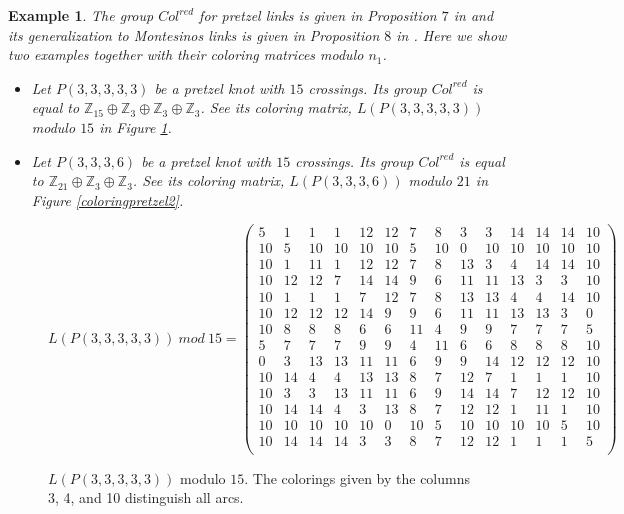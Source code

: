 \documentclass[11pt]{amsart}
\newtheorem{example}[theorem]{Example}
\begin{document}
\begin{example}

The group $Col^{red}$ for pretzel links is given in Proposition $7$ in \cite{APS} and its generalization to Montesinos links is given in Proposition $8$ in \cite{APS}. Here we show two examples together with their coloring matrices modulo $n_1$.

\begin{itemize}

\item[(a)] Let $P(3,3,3,3,3)$ be a pretzel knot with $15$ crossings. Its group  $Col^{red}$ is equal to $\mathbb{Z}_{15} \oplus \mathbb{Z}_3 \oplus \mathbb{Z}_3 \oplus \mathbb{Z}_3$. See its coloring matrix, $L(P(3,3,3,3,3))$ modulo $15$ in Figure \ref{coloringpretzel1}.

\item[(b)]  Let $P(3,3,3,6)$ be a pretzel knot with $15$ crossings. Its group $Col^{red}$ is equal to $\mathbb{Z}_{21} \oplus \mathbb{Z}_3 \oplus \mathbb{Z}_3$. See its coloring matrix, $L(P(3,3,3,6))$ modulo $21$ in Figure \ref{coloringpretzel2}.

\end{itemize}

\end{example}   

\begin{figure}
$L(P(3,3,3,3,3))\ mod \ 15=\left(
\begin{array}{cccccccccccccc}
 5 & 1 & 1 & 1 & 12 & 12 & 7 & 8 & 3 & 3 & 14 & 14 & 14 & 10 \\
 10 & 5 & 10 & 10 & 10 & 10 & 5 & 10 & 0 & 10 & 10 & 10 & 10 & 10 \\
 10 & 1 & 11 & 1 & 12 & 12 & 7 & 8 & 13 & 3 & 4 & 14 & 14 & 10 \\
 10 & 12 & 12 & 7 & 14 & 14 & 9 & 6 & 11 & 11 & 13 & 3 & 3 & 10 \\
 10 & 1 & 1 & 1 & 7 & 12 & 7 & 8 & 13 & 13 & 4 & 4 & 14 & 10 \\
 10 & 12 & 12 & 12 & 14 & 9 & 9 & 6 & 11 & 11 & 13 & 13 & 3 & 0 \\
 10 & 8 & 8 & 8 & 6 & 6 & 11 & 4 & 9 & 9 & 7 & 7 & 7 & 5 \\
 5 & 7 & 7 & 7 & 9 & 9 & 4 & 11 & 6 & 6 & 8 & 8 & 8 & 10 \\
 0 & 3 & 13 & 13 & 11 & 11 & 6 & 9 & 9 & 14 & 12 & 12 & 12 & 10 \\
 10 & 14 & 4 & 4 & 13 & 13 & 8 & 7 & 12 & 7 & 1 & 1 & 1 & 10 \\
 10 & 3 & 3 & 13 & 11 & 11 & 6 & 9 & 14 & 14 & 7 & 12 & 12 & 10 \\
 10 & 14 & 14 & 4 & 3 & 13 & 8 & 7 & 12 & 12 & 1 & 11 & 1 & 10 \\
 10 & 10 & 10 & 10 & 10 & 0 & 10 & 5 & 10 & 10 & 10 & 10 & 5 & 10 \\
 10 & 14 & 14 & 14 & 3 & 3 & 8 & 7 & 12 & 12 & 1 & 1 & 1 & 5 \\
\end{array}
\right)$
\caption{$L(P(3,3,3,3,3))$ modulo $15$. The colorings given by the columns 3, 4, and 10 distinguish all arcs.}\label{coloringpretzel1}
\end{figure}
\end{document}
